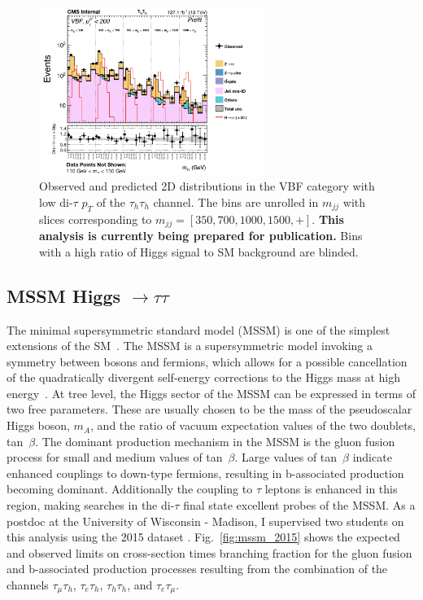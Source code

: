 \documentclass[preprint,12pt]{elsarticle}
\begin{document}
\begin{figure}[htbp]
\centering
     \includegraphics[width=0.65\textwidth]{HTT_Plots_combined.jpeg}
     \caption{Observed and predicted 2D distributions in the VBF category with low di-$\tau$ $p_{T}$ of the $\tau_{h}\tau_{h}$ channel. The bins are unrolled in $m_{jj}$ with slices corresponding to $m_{jj} = [350,700,1000,1500,+]$. \textbf{This analysis is currently being prepared for publication.} Bins with a high ratio of Higgs signal to SM background are blinded.}
     \label{fig:prefit_vbflow}
\end{figure}

\subsection{MSSM Higgs $\rightarrow\tau\tau$}
The minimal supersymmetric standard model (MSSM) is one of the simplest extensions of the SM~\cite{FAYET1975104,FAYET1977489}.
The MSSM is a supersymmetric model invoking a symmetry between bosons and fermions,
which allows for a possible cancellation of the quadratically divergent self-energy 
corrections to the Higgs mass at high energy~\cite{WESS197439}.
At tree level, the Higgs sector of the MSSM can be expressed in terms of two free parameters. 
These are usually chosen to be the mass of the pseudoscalar Higgs boson, $m_{A}$, 
and the ratio of vacuum expectation values of the two doublets, tan~$\beta$. The dominant production mechanism in 
the MSSM is the gluon fusion process for small and medium values of tan~$\beta$. Large values of 
tan~$\beta$ indicate enhanced couplings to down-type fermions, resulting in b-associated production 
becoming dominant. Additionally the coupling to $\tau$ leptons is enhanced in this region, making 
searches in the di-$\tau$ final state excellent probes of the MSSM.
As a postdoc at the University of Wisconsin - Madison, I supervised two students on this analysis 
using the 2015 dataset  \cite{CMS-PAS-HIG-16-006}. Fig.~\ref{fig:mssm_2015} shows the expected and observed limits on cross-section 
times branching fraction for the gluon fusion and b-associated production processes resulting from the
combination of the channels $\tau_{\mu}\tau_{h}$, $\tau_{e}\tau_{h}$, $\tau_{h}\tau_{h}$, and $\tau_{e}\tau_{\mu}$.
\end{document}
